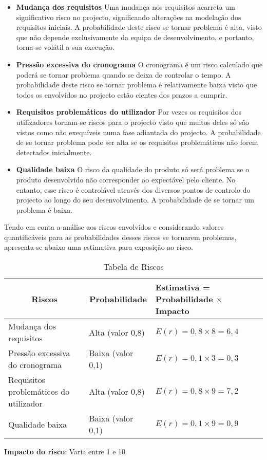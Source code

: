 \begin{itemize}
\item \textbf{Mudança dos requisitos} 
Uma mudança nos requisitos acarreta um significativo risco no projecto, significando alterações na modelação dos requisitos iniciais. A probabilidade deste risco se tornar problema é alta, visto que não depende exclusivamente da equipa de desenvolvimento, e portanto, torna-se volátil a sua execução.

\item \textbf{Pressão excessiva do cronograma} 
O cronograma é um risco calculado que poderá se tornar problema quando se deixa de controlar o tempo. A probabilidade deste risco se tornar problema é relativamente baixa visto que todos os envolvidos no projecto estão cientes dos prazos a cumprir.

\item \textbf{Requisitos problemáticos do utilizador}
Por vezes os requisitos dos utilizadores tornam-se riscos para o projecto visto que muitos deles só são vistos como não exequíveis numa fase adiantada do projecto. A probabilidade de se tornar problema pode ser alta se os requisitos problemáticos não forem detectados inicialmente.

\item \textbf{Qualidade baixa}
O risco da qualidade do produto só será problema se o produto desenvolvido não corresponder ao expectável pelo cliente. No entanto, esse risco é controlável através dos diversos pontos de controlo do projecto ao longo do seu desenvolvimento. A probabilidade de se tornar um problema é baixa.
\end{itemize}

Tendo em conta a análise aos riscos envolvidos e considerando valores quantificáveis para as probabilidades desses riscos se tornarem problemas, apresenta-se abaixo uma estimativa para exposição ao risco.

\begin{table}[!h]
\begin{center}
\begin{tabular}{|p{3.5cm}|p{3.5cm}|p{4cm}|}
\hline \multicolumn{1}{|c|}{\T \B \textbf{Riscos}} & \multicolumn{1}{|c|}{\textbf{Probabilidade}} & \textbf{Estimativa = Probabilidade $\times$ Impacto}\\
\hline \T \B Mudança dos requisitos & Alta (valor 0,8) & $E(r) = 0,8 \times 8 = 6,4$\\
\hline \T \B Pressão excessiva do cronograma & Baixa (valor 0,1) & $E(r) = 0,1 \times 3 = 0,3$\\
\hline \T \B Requisitos problemáticos do utilizador & Alta (valor 0,8) & $E(r) = 0,8 \times 9 = 7,2$\\
\hline \T \B Qualidade baixa & Baixa (valor 0,1) & $E(r) = 0,1 \times 9 = 0,9$\\
\hline
\end{tabular}
 \caption{Tabela de Riscos}
\end{center}
\end{table}
\textbf{Impacto do risco}: Varia entre 1 e 10

